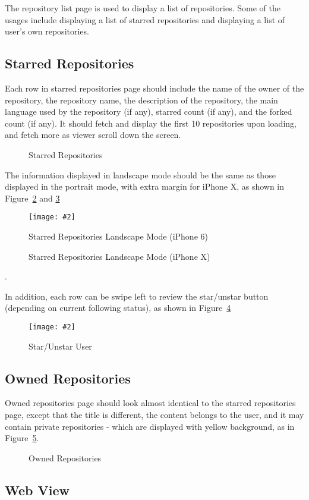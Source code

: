 \documentclass[12pt]{article}
\newcommand{\img}[3]{
\begin{figure}
\begin{center}
\texttt{[image: \#2]}
\caption{#3}\label{#2}
\end{center}
\end{figure}
}
\newcommand{\imgh}[4]{
    \begin{figure}[!htbp]%
    \begin{center}
    \subfloat{{\texttt{[image: \#2]} }}%
    \qquad
    \subfloat{{\texttt{[image: \#3]} }}%
    \caption{#4}\label{#2}
    \end{center}
\end{figure}
}
\begin{document}
The repository list page is used to display a list of repositories. Some of the usages include displaying a list of starred repositories and displaying a list of user's own repositories.

\subsection{Starred Repositories}

Each row in starred repositories page should include the name of the owner of the repository, the repository name, the description of the repository, the main language used by the repository (if any), starred count (if any), and the forked count (if any). It should fetch and display the first 10 repositories upon loading, and fetch more as viewer scroll down the screen.

\imgh{0.45}{starred_repositories}{starred_repositories_iphoneX}{Starred Repositories}

The information displayed in landscape mode should be the same as those displayed in the portrait mode, with extra margin for iPhone X, as shown in Figure~\ref{landscape_starred} and \ref{landscape_starred_iphoneX}

\img{0.45}{landscape_starred}{Starred Repositories Landscape Mode (iPhone 6)}

\imgh{0.45}{landscape_starred_iphoneX}{landscape_starred_iphoneX_right}{Starred Repositories Landscape Mode (iPhone X)}.

In addition, each row can be swipe left to review the star/unstar button (depending on current following status), as shown in Figure~\ref{repository_button}

\img{0.45}{repository_button}{Star/Unstar User}

\subsection{Owned Repositories}

Owned repositories page should look almost identical to the starred repositories page, except that the title is different, the content belongs to the user, and it may contain private repositories - which are displayed with yellow background, as in Figure~\ref{owned_repositories}.

\imgh{0.45}{owned_repositories}{owned_repositories_iphoneX}{Owned Repositories}

\subsection{Web View}
\end{document}
